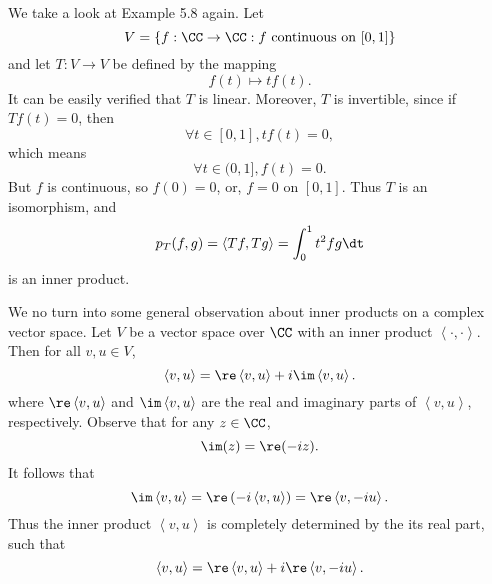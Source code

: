 \documentclass[linearalgebraII]{subfiles}
\begin{document}
    \begin{example}
        We take a look at Example 5.8 again. Let
        \begin{equation*}
            V = \left\lbrace f:\CC\to\CC: f\text{ continuous on }[0,1] \right\rbrace 
        \end{equation*}
        and let $T:V\to V$ be defined by the mapping
        \begin{equation*}
            f(t)\mapsto tf(t).
        \end{equation*}
        It can be easily verified that $T$ is linear. Moreover, $T$ is invertible, since if $Tf(t) = 0$, then
        \begin{equation*}
            \forall t\in[0,1], tf(t) = 0,
        \end{equation*}
        which means
        \begin{equation*}
            \forall t\in(0,1], f(t) = 0.
        \end{equation*}
        But $f$ is continuous, so $f(0) = 0$, or, $f=0$ on $[0,1]$. Thus $T$ is an isomorphism, and
        \begin{equation*}
            p_T(f,g) = \left\langle Tf, Tg\right\rangle = \int^{1}_{0} t^2fg\dt
        \end{equation*}
        is an inner product.
    \end{example}

    \begin{remark}
        We no turn into some general observation about inner products on a complex vector space. Let $V$ be a vector space over $\CC$ with an inner product $\left\langle \cdot, \cdot\right\rangle $. Then for all $v,u\in V$,
        \begin{equation*}
            \left\langle v, u\right\rangle = \re\left\langle v, u\right\rangle + i\im\left\langle v, u\right\rangle .
        \end{equation*}
        where $\re\left\langle v, u\right\rangle$ and $\im\left\langle v, u\right\rangle$ are the real and imaginary parts of $\left\langle v, u\right\rangle $, respectively. Observe that for any $z\in\CC$,
        \begin{equation*}
            \im(z) = \re(-iz).
        \end{equation*}
        It follows that
        \begin{equation*}
            \im\left\langle v, u\right\rangle = \re\left( -i\left\langle v, u\right\rangle  \right) = \re\left\langle v, -iu\right\rangle .
        \end{equation*}
        Thus the inner product $\left\langle v,u \right\rangle$ is completely determined by the its real part, such that
        \begin{equation*}
            \left\langle v, u\right\rangle = \re\left\langle v, u\right\rangle + i\re\left\langle v, -iu\right\rangle.
        \end{equation*}
    \end{remark}
\end{document}
